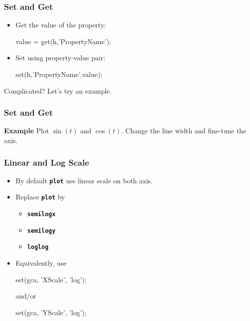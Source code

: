 \documentclass{beamer}  %
\newcommand{\tttbf}[1]{\texttt{\textbf{#1}}} %
\begin{document}
\begin{frame}[fragile]
\frametitle{Set and Get}
\begin{itemize}
    \item Get the value of the property:
          \begin{matlabcode}[frame=none]
          value = get(h,'PropertyName');
          \end{matlabcode}
          
    \item Set using property-value pair:
          \begin{matlabcode}[frame=none]
          set(h,'PropertyName',value);
          \end{matlabcode}
\end{itemize}
Complicated? Let's try an example.
\end{frame}
\begin{frame}[fragile]
\frametitle{Set and Get}
\textbf{Example} 
Plot $\sin(t)$ and $\cos(t)$. Change the line width and fine-tune the axis.
\setcounter{subfigure}{0}
\begin{figure}
    \centering
\end{figure}

\end{frame}
\begin{frame}[fragile]
\frametitle{Linear and Log Scale}
\begin{itemize}[<+->]
    \item By default \tttbf{plot} use linear scale on both axis.
    
    \item Replace \tttbf{plot} by
    \begin{itemize}
        \item \tttbf{semilogx}
        \item \tttbf{semilogy}
        \item \tttbf{loglog}
    \end{itemize}        
    
    \item Equivalently, use 
          \begin{matlabcode}[numbers=none,frame=none]
          set(gca, 'XScale', 'log');
          \end{matlabcode}
          and/or
          \begin{matlabcode}[numbers=none,frame=none]
          set(gca, 'YScale', 'log');
          \end{matlabcode}
\end{itemize}

\end{frame}
\end{document}
